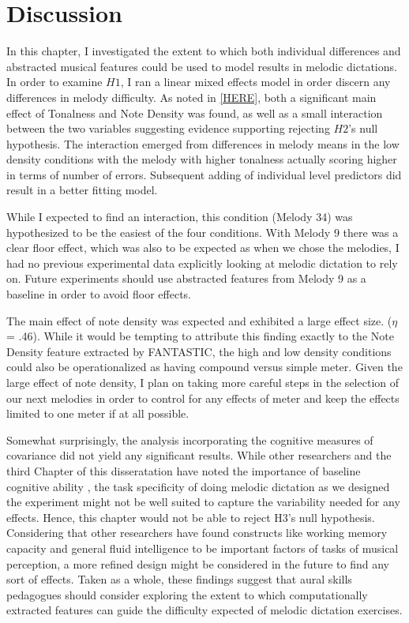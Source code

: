 \documentclass[12pt,]{book}
\begin{document}
\hypertarget{discussion-2}{%
\section{Discussion}\label{discussion-2}}

In this chapter, I investigated the extent to which both individual differences and abstracted musical features could be used to model results in melodic dictations.
In order to examine \(H1\), I ran a linear mixed effects model in order discern any differences in melody difficulty.
As noted in \ref{HERE}, both a significant main effect of Tonalness and Note Density was found, as well as a small interaction between the two variables suggesting evidence supporting rejecting \(H2\)'s null hypothesis.
The interaction emerged from differences in melody means in the low density conditions with the melody with higher tonalness actually scoring higher in terms of number of errors.
Subsequent adding of individual level predictors did result in a better fitting model.

While I expected to find an interaction, this condition (Melody 34) was hypothesized to be the easiest of the four
conditions.
With Melody 9 there was a clear floor effect, which was also to be expected as when we chose the melodies, I had no previous experimental data explicitly looking at melodic dictation to rely on.
Future experiments should use abstracted features from Melody 9 as a baseline in order to avoid floor effects.

The main effect of note density was expected and exhibited a large effect size. (\(\eta\) = .46).
While it would be tempting to attribute this finding exactly to the Note Density feature extracted by FANTASTIC, the high and low density conditions could also be operationalized as having compound versus simple meter.
Given the large effect of note density, I plan on taking more careful steps in the selection of our next melodies in order to control for any effects of meter and keep the effects limited to one meter if at all possible.

Somewhat surprisingly, the analysis incorporating the cognitive measures of covariance did not yield any significant
results.
While other researchers and the third Chapter of this disseratation have noted the importance of baseline cognitive ability \citep{schellenbergMusicCognitiveAbilities2013}, the task specificity of doing melodic dictation as we designed the experiment might not be well suited to capture the variability needed for any effects.
Hence, this chapter would not be able to reject H3's null hypothesis.
Considering that other researchers have found constructs like working memory capacity and general fluid intelligence to be important factors of tasks of musical perception, a more refined design might be considered in the future to find any sort of effects.
Taken as a whole, these findings suggest that aural skills pedagogues should consider exploring the extent to which computationally extracted features can guide the difficulty expected of melodic dictation exercises.
\end{document}
